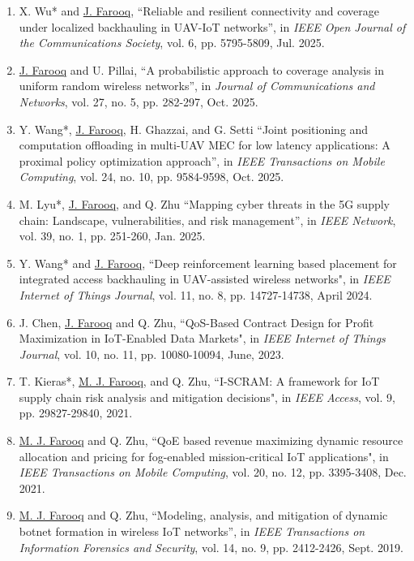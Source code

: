 \documentclass[letterpaper,11pt]{article}
\begin{document}
\begin{enumerate}
        \item[\rm{[J15]}] X. Wu* and \underline{J. Farooq}, ``Reliable and resilient connectivity and coverage under localized backhauling in UAV-IoT networks'', in \textit{IEEE Open Journal of the Communications Society}, vol. 6, pp. 5795-5809, Jul. 2025.
        \item[\rm{[J14]}] \underline{J. Farooq} and U. Pillai, ``A probabilistic approach to coverage analysis in uniform random wireless networks'', in \textit{Journal of Communications and Networks}, vol. 27, no. 5, pp. 282-297, Oct. 2025.
        \item[\rm{[J13]}] Y. Wang*, \underline{J. Farooq}, H. Ghazzai, and G. Setti ``Joint positioning and computation offloading in multi-UAV MEC for low latency applications: A proximal policy optimization approach'', in \textit{IEEE Transactions on Mobile Computing}, vol. 24, no. 10, pp. 9584-9598, Oct. 2025.
        \item[\rm{[J12]}] M. Lyu*, \underline{J. Farooq}, and Q. Zhu ``Mapping cyber threats in the 5G supply chain: Landscape, vulnerabilities, and risk management'', in \textit{IEEE Network}, vol. 39, no. 1, pp. 251-260, Jan. 2025.
        \item[\rm{[J11]}] Y. Wang* and \underline{J. Farooq}, ``Deep reinforcement learning based placement for integrated access backhauling in UAV-assisted wireless networks", in \textit{IEEE Internet of Things Journal}, vol. 11, no. 8, pp. 14727-14738, April 2024.
        \item[\rm{[J10]}] J. Chen, \underline{J. Farooq} and Q. Zhu, ``QoS-Based Contract Design for Profit Maximization in IoT-Enabled Data Markets", in \textit{IEEE Internet of Things Journal}, vol. 10, no. 11, pp. 10080-10094, June, 2023.
        \item[\rm{[J9]}] T. Kieras*, \underline{M. J. Farooq}, and Q. Zhu, ``I-SCRAM: A framework for IoT supply chain risk analysis and mitigation decisions", in \textit{IEEE Access}, vol. 9, pp. 29827-29840, 2021.
        \item[\rm{[J8]}] \underline{M. J. Farooq} and Q. Zhu, ``QoE based revenue maximizing dynamic resource allocation and pricing for fog-enabled mission-critical IoT applications", in \textit{IEEE Transactions on Mobile Computing}, vol. 20, no. 12, pp. 3395-3408, Dec. 2021.
        \item[\rm{[J7]}] \underline{M. J. Farooq} and Q. Zhu, ``Modeling, analysis, and mitigation of dynamic botnet formation in wireless IoT networks'', in \textit{IEEE Transactions on Information Forensics and Security}, vol. 14, no. 9, pp. 2412-2426, Sept. 2019.

\end{enumerate}
\end{document}
